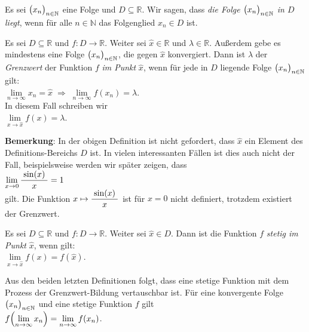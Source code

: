 Es sei $\bigl(x_n\bigr)_{n\in\mathbb{N}}$ eine Folge und $D\subseteq \mathbb{R}$.  Wir sagen, dass 
\emph{die Folge $\bigl(x_n\bigr)_{n\in\mathbb{N}}$ in $D$ liegt}, wenn f\"ur alle $n \in \mathbb{N}$ das Folgenglied $x_n
\in D$ ist.

\begin{Definition}[Grenzwert]
  Es sei $D\subseteq \mathbb{R}$ und $f:D \rightarrow \mathbb{R}$.
  Weiter sei $\widehat{x} \in \mathbb{R}$ und  $\lambda\in \mathbb{R}$.  Au{\ss}erdem gebe es
  mindestens eine Folge $\bigl(x_n\bigr)_{n\in\mathbb{N}}$, die gegen $\widehat{x}$ konvergiert.
  Dann ist $\lambda$ der \emph{Grenzwert} der Funktion $f$ \emph{im Punkt} $\widehat{x}$,
  wenn f\"ur jede in $D$ liegende Folge $\bigl(x_n\bigr)_{n\in\mathbb{N}}$ gilt:
      \\[0.2cm]
      \hspace*{1.3cm}      
      $\lim\limits_{n\rightarrow\infty} x_n = \widehat{x} \;\Rightarrow\; \lim\limits_{n\rightarrow\infty} f(x_n) = \lambda$.
      \\[0.2cm]
      In diesem Fall schreiben wir 
      \\[0.2cm]
      \hspace*{1.3cm}      
      $\lim\limits_{x \rightarrow \widehat{x}} f(x) = \lambda$. 
      \eod
\end{Definition}

\noindent
\textbf{Bemerkung}:  In der obigen Definition ist nicht gefordert,
dass $\widehat{x}$ ein Element des Definitions-Bereichs  $D$ ist.  In vielen interessanten F\"allen
ist dies auch nicht der Fall, beispielsweise werden wir sp\"ater zeigen, dass 
\\[0.2cm]
\hspace*{1.3cm}      
$\lim\limits_{x \rightarrow 0} \displaystyle\frac{\;\displaystyle\sin(x)\;}{\;\displaystyle x\;} = 1$
\\[0.2cm]
gilt. Die Funktion $x \mapsto \displaystyle\frac{\;\displaystyle\sin(x)\;}{\;\displaystyle x\;}$ ist f\"ur $x=0$ nicht definiert, trotzdem
existiert der Grenzwert.
\eox


\begin{Definition}[Stetigkeit]
  Es sei $D\subseteq \mathbb{R}$ und $f:D \rightarrow \mathbb{R}$.
  Weiter sei $\widehat{x}\in D$. Dann ist die Funktion $f$ \emph{stetig im Punkt} $\widehat{x}$,
  wenn gilt: \\[0.2cm]
  \hspace*{1.3cm}      
  $\lim\limits_{x\rightarrow \widehat{x}} f(x) = f(\widehat{x})$.  \eod
\end{Definition}

\noindent
Aus den beiden letzten Definitionen folgt, dass
eine stetige Funktion mit dem Prozess der Grenzwert-Bildung vertauschbar ist.  
F\"ur eine konvergente Folge $\bigl(x_n\bigr)_{n\in\mathbb{N}}$ und eine stetige Funktion $f$ gilt 
      \\[0.2cm]
      \hspace*{1.3cm}      
      $f\Bigl(\lim\limits_{n\rightarrow\infty} x_n\Bigr) = \lim\limits_{n\rightarrow\infty} f(x_n)$.
\vspace*{0.3cm}

